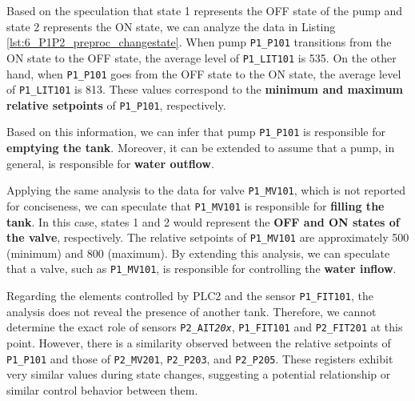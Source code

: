 Based on the speculation that state 1 represents the OFF state of the pump and state 2 represents the ON state, we can analyze the data in Listing \ref{lst:6_P1P2_preproc_changestate}. When pump \texttt{P1\_P101} transitions from the ON state to the OFF state, the average level of \texttt{P1\_LIT101} is 535. On the other hand, when \texttt{P1\_P101} goes from the OFF state to the ON state, the average level of \texttt{P1\_LIT101} is 813. These values correspond to the \textbf{minimum and maximum relative setpoints} of \texttt{P1\_P101}, respectively. 

Based on this information, we can infer that pump \texttt{P1\_P101} is responsible for \textbf{emptying the tank}. Moreover, it can be extended to assume that a pump, in general, is responsible for \textbf{water outflow}.

\bigskip
Applying the same analysis to the data for valve \texttt{P1\_MV101}, which is not reported for conciseness, we can speculate that \texttt{P1\_MV101} is responsible for \textbf{filling the tank}. In this case, states 1 and 2 would represent the \textbf{OFF and ON states of the valve}, respectively. The relative setpoints of \texttt{P1\_MV101} are approximately 500 (minimum) and 800 (maximum).
By extending this analysis, we can speculate that a valve, such as \texttt{P1\_MV101}, is responsible for controlling the \textbf{water inflow}.

\bigskip
Regarding the elements controlled by PLC2 and the sensor \texttt{P1\_FIT101}, the analysis does not reveal the presence of another tank. Therefore, we cannot determine the exact role of sensors \texttt{P2\_AIT\textit{20x}}, \texttt{P1\_FIT101} and \texttt{P2\_FIT201} at this point.
However, there is a similarity observed between the relative setpoints of \texttt{P1\_P101} and those of \texttt{P2\_MV201}, \texttt{P2\_P203}, and \texttt{P2\_P205}. These registers exhibit very similar values during state changes, suggesting a potential relationship or similar control behavior between them.

